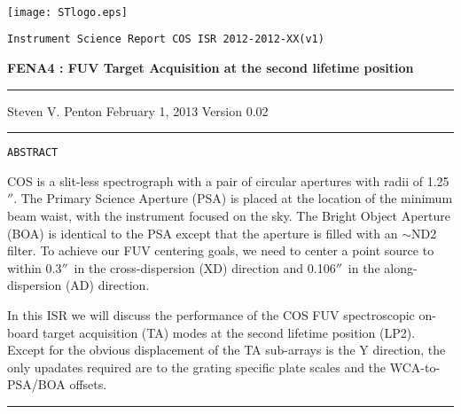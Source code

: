 \documentclass[12pt]{article}
\newcommand{\arcsec}{\ensuremath{''}}
\newcommand{\thisISR}{2012-XX(v1)}
\begin{document}
\selectfont
{}\selectfont
~\\

\vspace{-2.4cm}
\noindent\texttt{[image: STlogo.eps]}

\vspace{-0.4cm}

\begin{flushright}
 \texttt{Instrument Science Report COS ISR 2012-\thisISR}
\vspace{1.1cm}


{\bf\Huge FENA4 : FUV Target Acquisition at the second lifetime position}

\rule{0.25\linewidth}{0.5pt}

\vspace{0.5cm}

Steven V. Penton \linebreak
February 1, 2013
Version 0.02
\end{flushright}

\vspace{0.1cm}

\noindent\rule{\linewidth}{1.0pt}
\noindent \texttt{A{\footnotesize BSTRACT}}

{\it \noindent

COS is a slit-less spectrograph with a pair of circular apertures with radii of 1.25\arcsec. The Primary Science Aperture (PSA) is
placed at the location of the minimum beam waist, with the instrument focused on the sky. The Bright Object Aperture (BOA) is
identical to the PSA except that the aperture is filled with an $\sim$ND2 filter.
To achieve our FUV centering goals, we need to center a point source to within 0.3\arcsec\ in the cross-dispersion (XD) direction and 0.106\arcsec\ in the along-dispersion (AD) direction.

In this ISR we will discuss the performance of the COS FUV spectroscopic on-board target acquisition (TA) modes at the second lifetime position (LP2). Except for the obvious displacement of the TA sub-arrays is the Y direction, the only upadates required are to the grating specific plate scales and the WCA-to-PSA/BOA offsets.
}

\vspace{-0.1cm}
\noindent\rule{\linewidth}{1.0pt}
\clearpage
\setcounter{tocdepth}{4}
\small
\tableofcontents
\listoftables
\clearpage
\listoffigures
\normalsize
\clearpage
\vspace{-0.3cm}
\end{document}
